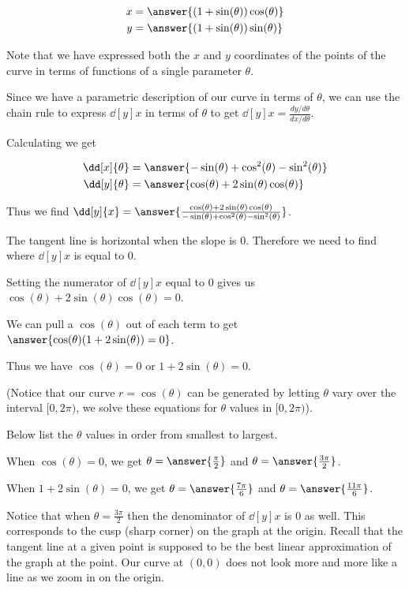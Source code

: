 \documentclass{ximera}
\begin{document}
\begin{exercise}
\begin{hint}
\begin{align*}
x&=\answer{(1+\sin(\theta))\cos(\theta)} \\
y&=\answer{(1+\sin(\theta))\sin(\theta) }
\end{align*}

Note that we have expressed both the $x$ and $y$ coordinates of the points of the curve in terms of functions of a single parameter $\theta$.

Since we have a parametric description of our curve in terms of $\theta$, 
we can use the chain rule to express $\dd[y]{x}$ in terms of $\theta$ to get $\dd[y]{x}=\frac{ dy/d\theta}{dx/d\theta}$.

Calculating we get

\begin{align*}
\dd[x]{\theta}&=\answer{ -\sin(\theta)+\cos^2(\theta)-\sin^2(\theta)  } \\
\dd[y]{\theta}&=\answer{ \cos(\theta) + 2\sin(\theta)\cos(\theta)   }
\end{align*} 

Thus we find $\dd[y]{x}=\answer{\frac{ \cos(\theta) + 2\sin(\theta)\cos(\theta) }{-\sin(\theta)+\cos^2(\theta)-\sin^2(\theta) }}$. 

The tangent line is horizontal when the slope is $0$. Therefore we need to find where $\dd[y]{x}$ is equal to $0$.

Setting the numerator of $\dd[y]{x}$ equal to $0$ gives us $\cos(\theta) + 2\sin(\theta)\cos(\theta)=0$. 

We can pull a $\cos(\theta)$ out of each term to get $\answer{\cos(\theta)(1+2\sin(\theta))=0 }$. 

Thus we have $\cos(\theta)=0$ or $1+2\sin(\theta)=0$. 


(Notice that our curve $r=\cos(\theta)$ can be generated by letting $\theta$ vary over the interval $[0, 2\pi)$, we solve these equations for $\theta$ values in  $[0, 2\pi)$).

Below list the $\theta$ values in order from smallest to largest.  

When $\cos(\theta)=0$, we get $\theta=\answer{\frac{\pi}{2}}$ and $\theta=\answer{\frac{3\pi}{2}}$.  

When $1+2\sin(\theta)=0$, we get $\theta=\answer{ \frac{7\pi}{6}}$ and $\theta=\answer{\frac{11\pi}{6}}$.

Notice that when $\theta=\frac{3\pi}{2}$ then the denominator of $\dd[y]{x}$ is $0$ as well. This corresponds to the cusp (sharp corner) on the graph at the origin. Recall that the tangent line at a given point is supposed to be the best linear approximation of the graph at the point. Our curve at $(0,0)$ does not look more and more like a line as we zoom in on the origin. 


\end{hint}
\end{exercise}
\end{document}
